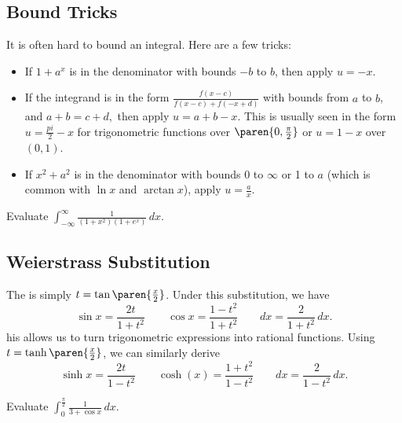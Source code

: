 \documentclass{article}
\begin{document}

\subsection{Bound Tricks}
It is often hard to bound an integral. Here are a few tricks:
\begin{itemize}
    \item If $1+a^x$ is in the denominator with bounds $-b$ to $b$, then apply $u=-x$.
    \item If the integrand is in the form $\frac{f(x-c)}{f(x-c)+f(-x+d)}$ with bounds from $a$ to $b$, and $a+b=c+d,$ then apply $u=a+b-x$. This is usually seen in the form $u=\frac{pi}{2}-x$ for trigonometric functions over $\paren{0,\frac{\pi}{2}}$ or $u=1-x$ over $(0,1)$.
    \item If $x^2+a^2$ is in the denominator with bounds 0 to $\infty$ or 1 to $a$ (which is common with $\ln x$ and $\arctan x$), apply $u=\frac{a}{x}$.
\end{itemize}

\begin{exer}
Evaluate $\int_{-\infty}^{\infty} \frac{1}{(1+x^2)(1+e^x)}\,dx$.
\end{exer}

\subsection{Weierstrass Substitution}
The  is simply $t=\tan\paren{\frac{x}{2}}$. Under this substitution, we have
$$\sin x=\frac{2t}{1+t^2} \qquad \cos x=\frac{1-t^2}{1+t^2} \qquad dx=\frac{2}{1+t^2}\,dx.$$
his allows us to turn trigonometric expressions into rational functions. Using $t=\tanh\paren{\frac{x}{2}}$, we can similarly derive
$$\sinh x=\frac{2t}{1-t^2} \qquad \cosh(x)=\frac{1+t^2}{1-t^2} \qquad dx=\frac{2}{1-t^2}\,dx.$$

\begin{exer}
Evaluate $\int_0^{\frac{\pi}{2}} \frac{1}{3+\cos x}\,dx$.
\end{exer}
\end{document}

